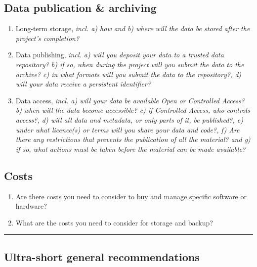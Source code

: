 \documentclass[10pt,a4paper,]{article}
\providecommand{\tightlist}{%
  \setlength{\itemsep}{0pt}\setlength{\parskip}{0pt}}
\begin{document}
\subsection{Data publication \&
archiving}\label{data-publication-archiving}

\begin{enumerate}
\def\labelenumi{\arabic{enumi}.}
\tightlist
\item
  Long-term storage, \emph{incl. a) how and b) where will the data be
  stored after the project's completion?}
\item
  Data publishing, \emph{incl. a) will you deposit your data to a
  trusted data repository? b) if so, when during the project will you
  submit the data to the archive? c) in what formats will you submit the
  data to the repository?, d) will your data receive a persistent
  identifier?}
\item
  Data access, \emph{incl. a) will your data be available Open or
  Controlled Access? b) when will the data become accessible? c) if
  Controlled Access, who controls access?, d) will all data and
  metadata, or only parts of it, be published?, e) under what licence(s)
  or terms will you share your data and code?, f) Are there any
  restrictions that prevents the publication of all the material? and g)
  if so, what actions must be taken before the material can be made
  available?}
\end{enumerate}

\subsection{Costs}\label{costs}

\begin{enumerate}
\def\labelenumi{\arabic{enumi}.}
\tightlist
\item
  Are there costs you need to consider to buy and manage specific
  software or hardware?
\item
  What are the costs you need to consider for storage and backup?
\end{enumerate}

\begin{center}\rule{0.5\linewidth}{\linethickness}\end{center}

\subsection{Ultra-short general
recommendations}\label{ultra-short-general-recommendations}
\end{document}
